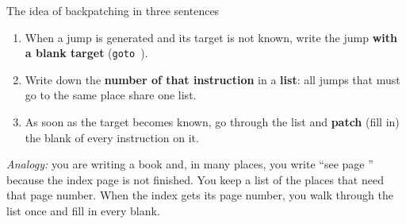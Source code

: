 \documentclass[11pt,a4paper]{article}
\begin{document}
\begin{defbox}{The idea of backpatching in three sentences}
\begin{enumerate}[nosep]
\item When a jump is generated and its target is not known, write the jump \textbf{with a blank target} (\texttt{goto \blk}).
\item Write down the \textbf{number of that instruction} in a \textbf{list}: all jumps that must go to the same place share one list.
\item As soon as the target becomes known, go through the list and \textbf{patch} (fill in) the blank of every instruction on it.
\end{enumerate}
\emph{Analogy:} you are writing a book and, in many places, you write ``see page \blk'' because the index page is not finished. You keep a list of the places that need that page number. When the index gets its page number, you walk through the list once and fill in every blank.
\end{defbox}
\end{document}
